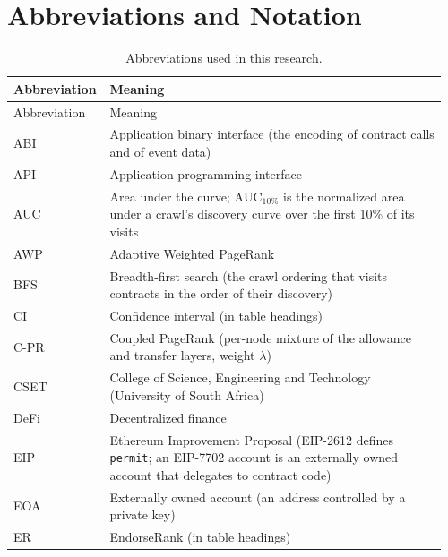 \chapter*{Abbreviations and Notation}
\label{ch:abbreviations}
\let\FrontMatterSavedThetable\thetable
\renewcommand{\thetable}{\Roman{table}}

\begingroup
\small{}\setlength{\tabcolsep}{4pt}\renewcommand{\arraystretch}{1.0}%
\setlength{\LTpre}{2pt}\setlength{\LTpost}{6pt}%
\begin{longtable}{@{}>{\raggedright\arraybackslash}p{0.19\linewidth}p{0.77\linewidth}@{}}
\caption{Abbreviations used in this research.}\label{tab:abbreviations}\\
\toprule
Abbreviation & Meaning \\
\midrule
\endfirsthead
\toprule
Abbreviation & Meaning \\
\midrule
\endhead
\bottomrule
\endfoot
ABI & Application binary interface (the encoding of contract calls and of event data) \\
API & Application programming interface \\
AUC & Area under the curve; $\mathrm{AUC}_{10\%}$ is the normalized area under a crawl's discovery curve over the first 10\% of its visits \\
AWP & Adaptive Weighted PageRank \\
BFS & Breadth-first search (the crawl ordering that visits contracts in the order of their discovery) \\
CI & Confidence interval (in table headings) \\
\mbox{C-PR} & Coupled PageRank (per-node mixture of the allowance and transfer layers, weight $\lambda$) \\
CSET & College of Science, Engineering and Technology (University of South Africa) \\
DeFi & Decentralized finance \\
EIP & Ethereum Improvement Proposal (EIP-2612 defines \texttt{permit}; an EIP-7702 account is an externally owned account that delegates to contract code) \\
EOA & Externally owned account (an address controlled by a private key) \\
ER & EndorseRank (in table headings) \\

\end{longtable}
